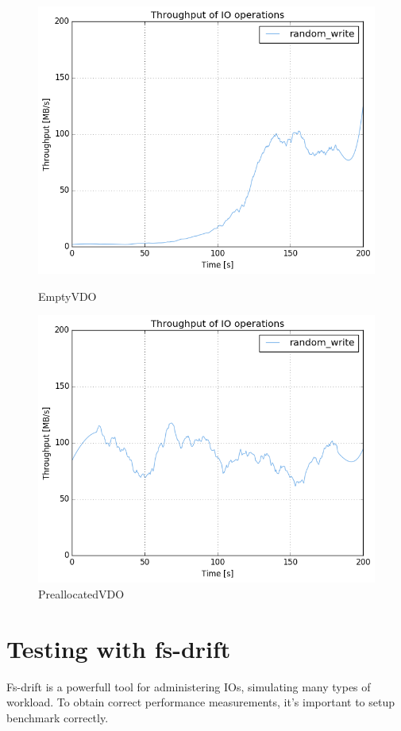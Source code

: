 \documentclass[
  color, %
  table, %
  lof,   %
  lot,   %
]{fithesis3}
\begin{document}
\clearpage
\begin{figure}[!h]
        \centering
        \includegraphics[width=\textwidth]{../results/empty_VDO/HDD/tar_467_bw}
\caption[EmptyVDO]{EmptyVDO}
\label{fig:emptyVDO}
        \centering
        \includegraphics[width=\textwidth]{../results/empty_VDO/HDD/tar_224_bw}
\caption[preallVDO]{PreallocatedVDO}
\label{fig:preallocatedVDO}
\end{figure}

\clearpage


\section{Testing with fs-drift}
Fs-drift is a powerfull tool for administering IOs, simulating many types of workload. To obtain correct performance measurements, it's important to setup benchmark correctly.
\end{document}
